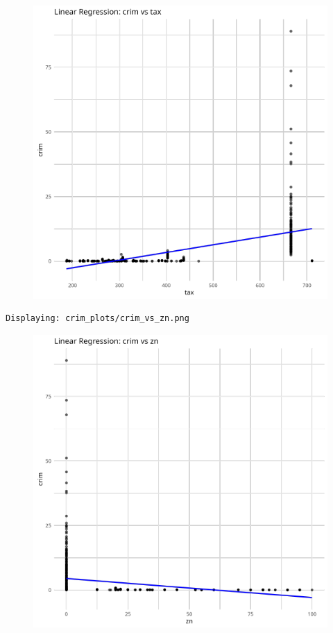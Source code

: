 \documentclass[
]{article}
\begin{document}
\begin{figure}[H]

{\centering \includegraphics{hw1_files/figure-pdf/unnamed-chunk-16-11.pdf}

}

\end{figure}

\begin{verbatim}
Displaying: crim_plots/crim_vs_zn.png 
\end{verbatim}

\begin{figure}[H]

{\centering \includegraphics{hw1_files/figure-pdf/unnamed-chunk-16-12.pdf}

}

\end{figure}
\end{document}

